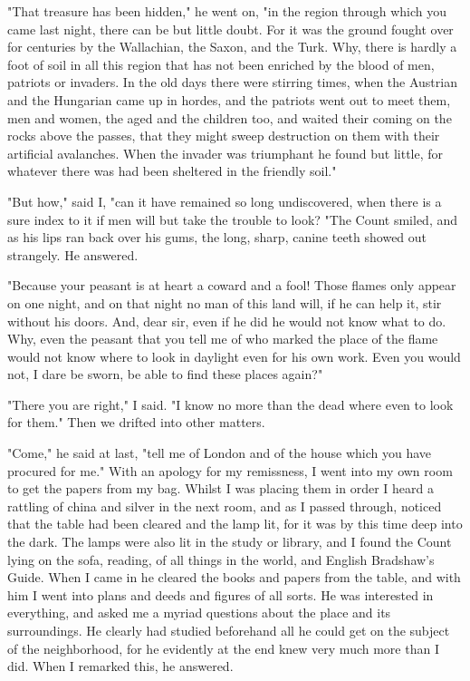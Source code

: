 "That treasure has been hidden," he went on, "in the region through which you came last night, there can be but little doubt. For it was the ground fought over for centuries by the Wallachian, the Saxon, and the Turk. Why, there is hardly a foot of soil in all this region that has not been enriched by the blood of men, patriots or invaders. In the old days there were stirring times, when the Austrian and the Hungarian came up in hordes, and the patriots went out to meet them, men and women, the aged and the children too, and waited their coming on the rocks above the passes, that they might sweep destruction on them with their artificial avalanches. When the invader was triumphant he found but little, for whatever there was had been sheltered in the friendly soil." 

"But how," said I, "can it have remained so long undiscovered, when there is a sure index to it if men will but take the trouble to look? "The Count smiled, and as his lips ran back over his gums, the long, sharp, canine teeth showed out strangely. He answered. 

"Because your peasant is at heart a coward and a fool! Those flames only appear on one night, and on that night no man of this land will, if he can help it, stir without his doors. And, dear sir, even if he did he would not know what to do. Why, even the peasant that you tell me of who marked the place of the flame would not know where to look in daylight even for his own work. Even you would not, I dare be sworn, be able to find these places again?" 

"There you are right," I said. "I know no more than the dead where even to look for them." Then we drifted into other matters. 

"Come," he said at last, "tell me of London and of the house which you have procured for me." With an apology for my remissness, I went into my own room to get the papers from my bag. Whilst I was placing them in order I heard a rattling of china and silver in the next room, and as I passed through, noticed that the table had been cleared and the lamp lit, for it was by this time deep into the dark. The lamps were also lit in the study or library, and I found the Count lying on the sofa, reading, of all things in the world, and English Bradshaw's Guide. When I came in he cleared the books and papers from the table, and with him I went into plans and deeds and figures of all sorts. He was interested in everything, and asked me a myriad questions about the place and its surroundings. He clearly had studied beforehand all he could get on the subject of the neighborhood, for he evidently at the end knew very much more than I did. When I remarked this, he answered. 

